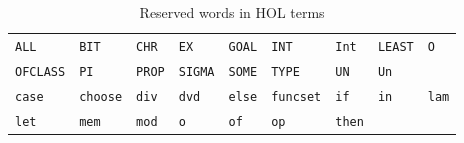 \begin{table}[htbp]
\begin{center}
\begin{tabular}{|lllllllll|}
\hline
\texttt{ALL} &
\texttt{BIT} &
\texttt{CHR} &
\texttt{EX} &
\texttt{GOAL} &
\texttt{INT} &
\texttt{Int} &
\texttt{LEAST} &
\texttt{O} \\
\texttt{OFCLASS} &
\texttt{PI} &
\texttt{PROP} &
\texttt{SIGMA} &
\texttt{SOME} &
\texttt{TYPE} &
\texttt{UN} &
\texttt{Un} &\\
\texttt{case} &
\texttt{choose} &
\texttt{div} &
\texttt{dvd} &
\texttt{else} &
\texttt{funcset} &
\texttt{if} &
\texttt{in} &
\texttt{lam} \\
\texttt{let} &
\texttt{mem} &
\texttt{mod} &
\texttt{o} &
\texttt{of} &
\texttt{op} &
\texttt{then}&&\\
\hline
\end{tabular}
\end{center}
\caption{Reserved words in HOL terms}
\label{tab:ReservedWords}
\end{table}



